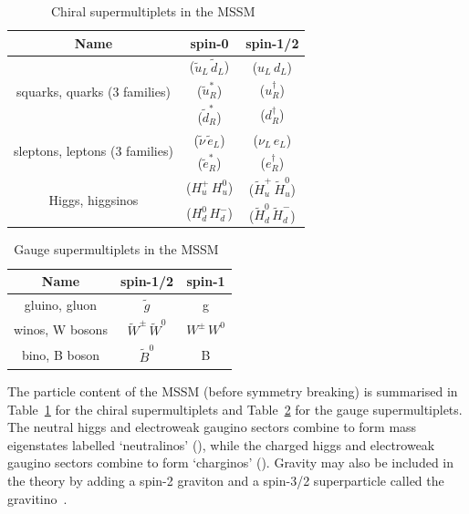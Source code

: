 \begin{table}[!h]
  \centering
  \caption{Chiral supermultiplets in the MSSM~\cite{SUSYP}}
  \label{tab:chiral}
  \begin{tabular}
    {ccc}
    \hline\hline
    Name& spin-0 & spin-1/2 \\
    \hline
    \multirow{3}{*}{squarks, quarks (3 families) }& ($\tilde{u}_L\,\tilde{d}_L$) & ($u_L\,d_L$) \\
    & ($\tilde{u}^{*}_R$) & ($u_R^{\dagger}$) \\
    & ($\tilde{d}^{*}_R$) & ($d_R^{\dagger}$) \\
    \hline
    \multirow{2}{*}{sleptons, leptons (3 families) }& ($\tilde{\nu}\,\tilde{e}_L$) & ($\nu_L\,e_L$) \\
    & ($\tilde{e}^{*}_R$) & ($e_R^{\dagger}$) \\
    \hline
    \multirow{2}{*}{Higgs, higgsinos}& ($H_u^{+}\,H_u^{0}$) &  ($\tilde{H}_u^{+}\,\tilde{H}_u^{0}$) \\
    & ($H_d^{0}\,H_d^{-}$) &  ($\tilde{H}_d^{0}\,\tilde{H}_d^{-}$) \\
  \end{tabular}
\end{table}

\begin{table}[!h]
  \centering
  \caption{Gauge supermultiplets in the MSSM~\cite{SUSYP}}
  \label{tab:vector}
  \begin{tabular}
    {ccc}
    \hline\hline
    Name& spin-1/2 & spin-1 \\
    \hline
    gluino, gluon & $\tilde{g}$ & g \\
    winos, W bosons & $\tilde{W}^{\pm}\,\tilde{W}^0$ & $W^{\pm}\,W^{0}$ \\
    bino, B boson & $\tilde{B}^0$ & B \\
  \end{tabular}
\end{table}

The particle content of the MSSM (before symmetry breaking) 
is summarised in Table~\ref{tab:chiral} for the chiral supermultiplets
and Table~\ref{tab:vector} for the gauge supermultiplets. The neutral higgs and electroweak 
gaugino sectors combine to form mass eigenstates labelled `neutralinos' 
(\chiz), while the charged higgs and electroweak gaugino sectors combine
to form `charginos' (\chip). Gravity may also be included in the theory
by adding a spin-2 graviton and a spin-3/2 superparticle
called the gravitino~\cite{SUSYP}. 

